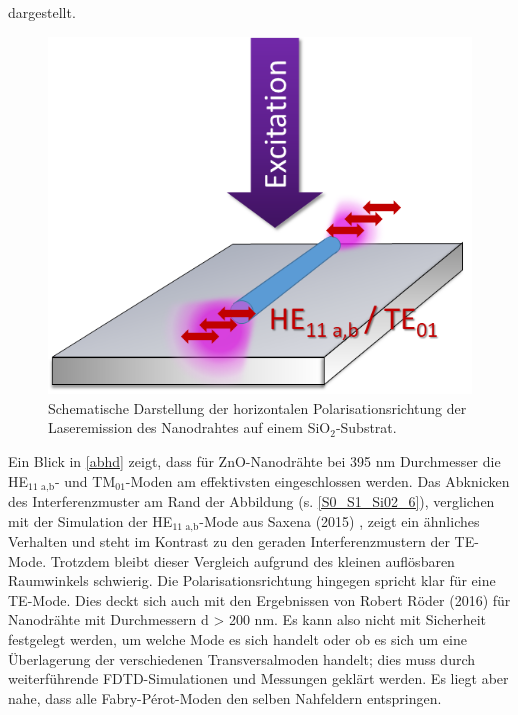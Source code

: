 dargestellt.\begin{figure}[b] \centering
\includegraphics[width=.35\textwidth]{Bilder/SiO2/PolPic} \caption{Schematische
Darstellung der horizontalen Polarisationsrichtung der Laseremission des
Nanodrahtes auf einem SiO$_\text{2}$-Substrat.} \label{PolPic} \end{figure}Ein
Blick in \autoref{abhd} zeigt, dass für ZnO-Nanodrähte bei 395 nm Durchmesser
die HE$_\text{11 a,b}$- und TM$_\text{01}$-Moden am effektivsten eingeschlossen
werden. Das Abknicken des Interferenzmuster am Rand der Abbildung (s.
\autoref{S0_S1_Si02_6}), verglichen mit der Simulation der HE$_\text{11
a,b}$-Mode aus Saxena (2015) \cite{Saxena.2015}, zeigt ein ähnliches Verhalten
und steht im Kontrast zu den geraden Interferenzmustern der TE-Mode. Trotzdem
bleibt dieser Vergleich aufgrund des kleinen auflösbaren Raumwinkels schwierig.
Die Polarisationsrichtung hingegen spricht klar für eine TE-Mode. Dies deckt
sich auch mit den Ergebnissen von Robert Röder (2016) \cite{Roeder.2016} für
Nanodrähte mit Durchmessern d > 200 nm.  Es kann also nicht mit Sicherheit
festgelegt werden, um welche Mode es sich handelt oder ob es sich um eine
Überlagerung der verschiedenen Transversalmoden handelt; dies muss durch
weiterführende FDTD-Simulationen und Messungen geklärt werden. Es liegt aber
nahe, dass alle Fabry-Pérot-Moden den selben Nahfeldern entspringen.
